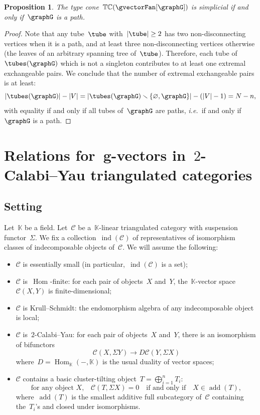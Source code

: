 \documentclass{amsart}
\newtheorem{proposition}[theorem]{Proposition}
\theoremstyle{definition}
\renewcommand{\b}[1]{{\boldsymbol{#1}}} %
\newcommand{\ssm}{\smallsetminus} %
\newcommand{\ie}{\textit{i.e.}~} %
\newcommand{\typeCone}{\mathbb{TC}} %
\newcommand{\field}{\mathbb{K}}
\newcommand{\cat}{\mathcal{C}}
\newcommand{\Hom}[1]{\operatorname{Hom}_{#1}}
\newcommand{\susp}{\Sigma}
\newcommand{\add}{\operatorname{add}}
\newcommand{\ind}{\operatorname{ind}}
\begin{document}
\begin{proposition}
The type cone~$\typeCone(\gvectorFan[\graphG])$ is simplicial if and only if~$\graphG$ is a path.
\end{proposition}

\begin{proof}
Note that any tube~$\tube$ with~$|\tube| \ge 2$ has two non-disconnecting vertices when it is a path, and at least three non-disconnecting vertices otherwise (the leaves of an arbitrary spanning tree of~$\tube$).
Therefore, each tube of~$\tubes(\graphG)$ which is not a singleton contributes to at least one extremal exchangeable pairs.
We conclude that the number of extremal exchangeable pairs is at least:
\[
|\tubes(\graphG)| - |V| = |\tubes(\graphG) \ssm \{\varnothing, \graphG\}| - (|V|-1) = N - n,
\]
with equality if and only if all tubes of~$\graphG$ are paths, \ie if and only if~$\graphG$ is a path.
\end{proof}


\section{Relations for~$\b{g}$-vectors in~$2$-Calabi--Yau triangulated categories}


\subsection{Setting}\label{sect::setting}
Let~$\field$ be a field.  Let~$\cat$ be a~$\field$-linear triangulated category with suspension functor~$\susp$.  We fix a collection~$\ind(\cat)$ of representatives of isomorphism classes of indecomposable objects of~$\cat$. We will assume the following:
\begin{itemize}
 \item $\cat$ is essentially small (in particular,~$\ind(\cat)$ is a set);
 \item $\cat$ is~$\Hom{}$-finite: for each pair of objects~$X$ and~$Y$, the~$\field$-vector space~$\cat(X,Y)$ is finite-dimensional;
 \item $\cat$ is Krull--Schmidt: the endomorphism algebra of any indecomposable object is local;
 \item $\cat$ is~$2$-Calabi--Yau: for each pair of objects~$X$ and~$Y$, there is an isomorphism of bifunctors
 \[
  \cat(X,\susp Y) \to D\cat(Y,\susp X)
 \]
 where~$D=\Hom{\field}(-,\field)$ is the usual duality of vector spaces;
 \item $\cat$ contains a basic cluster-tilting object~$T=\bigoplus_{i=1}^n T_i$:
 \[
  \textrm{for any object~$X$,} \quad \cat(T, \susp X) = 0 \quad \textrm{if and only if} \quad X\in \add(T),
 \]
 where~$\add(T)$ is the smallest additive full subcategory of~$\cat$ containing the~$T_i$'s and closed under isomorphisms.
\end{itemize}
\end{document}
